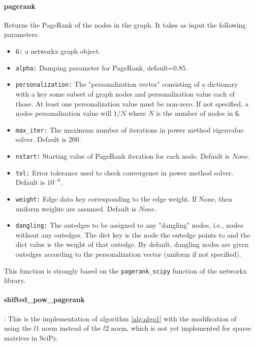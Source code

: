 \paragraph{pagerank} Returns the PageRank of the nodes in the graph. It takes as input the following parameters:
    \begin{itemize}
        \item \texttt{G:} a networkx graph object.
        \item \texttt{alpha:} Damping parameter for PageRank, default=$0.85$.
        \item \texttt{personalization:} The "personalization vector" consisting of a dictionary with a key some subset of graph nodes and personalization value each of those. At least one personalization value must be non-zero. If not specified, a nodes personalization value will $1/N$ where $N$ is the number of nodes in \texttt{G}.
        \item \texttt{max\_iter:} The maximum number of iterations in power method eigenvalue solver. Default is $200$.
        \item \texttt{nstart:} Starting value of PageRank iteration for each node. Default is $None$.
        \item \texttt{tol:} Error tolerance used to check convergence in power method solver. Default is $10^{-6}$.
        \item \texttt{weight:} Edge data key corresponding to the edge weight. If None, then uniform weights are assumed. Default is $None$.
        \item \texttt{dangling:} The outedges to be assigned to any "dangling" nodes, i.e., nodes without any outedges. The dict key is the node the outedge points to and the dict value is the weight of that outedge. By default, dangling nodes are given outedges according to the personalization vector (uniform if not specified).
    \end{itemize}
This function is strongly based on the \texttt{pagerank\_scipy} function of the networkx library.

\paragraph{shifted\_pow\_pagerank}: This is the implementation of algorithm \ref{alg:algo1} with the modification of using the $l1$ norm instead of the $l2$ norm, which is not yet implemented for sparse matrices in SciPy. \vspace{0.5cm}


